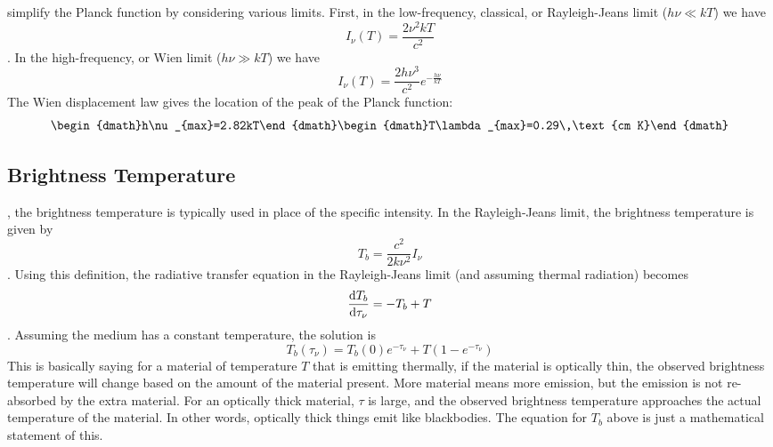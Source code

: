  simplify the Planck function by considering various limits.  First,
in the low-frequency, classical, or Rayleigh-Jeans limit ($h\nu\ll kT$) we have
\begin{dmath}\boxed{I_{\nu}(T)=\frac{2\nu^2kT}{c^2}}\end{dmath}.
In the high-frequency, or Wien limit ($h\nu\gg kT$) we have
\begin{dmath}I_{\nu}(T)=\frac{2h\nu^3}{c^2}e^{-\frac{h\nu}{kT}}\end{dmath}
The Wien displacement law gives the location of the peak of the Planck function:
\begin{dgroup}
\begin{dmath}h\nu_{max}=2.82kT\end{dmath}
\begin{dmath}T\lambda_{max}=0.29\,\text{cm K}\end{dmath}
\end{dgroup}

\subsection{Brightness Temperature}
, the brightness temperature is typically used in place of
the specific intensity.  In the Rayleigh-Jeans limit, the brightness temperature is given by
\begin{dmath}
    T_b = \frac{c^2}{2k\nu^2}I_\nu
\end{dmath}.
Using this definition, the radiative transfer equation in the Rayleigh-Jeans limit (and
assuming thermal radiation) becomes
\begin{dmath}\frac{\d T_b}{\d\tau_{\nu}}=-T_b+T\end{dmath}.
Assuming the medium has a constant temperature, the solution is
\begin{dmath}T_b(\tau_{\nu})=T_b(0)e^{-\tau_{\nu}}+T(1-e^{-\tau_{\nu}})\end{dmath}
This is basically saying for a material of temperature $T$ that is emitting thermally, if the 
material is optically thin, the observed brightness temperature will change based on the amount 
of the material present.  More material means more emission, but the emission is not re-absorbed 
by the extra material.  For an optically thick material, $\tau$ is large, and the observed 
brightness temperature approaches the actual temperature of the material.  In other words, 
optically thick things emit like blackbodies.  The equation for $T_b$ above is just a mathematical 
statement of this.

